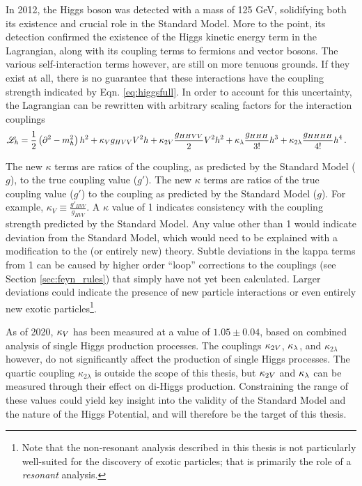     In 2012, the Higgs boson was detected with a mass of 125 GeV, solidifying both its existence and crucial role in the Standard Model.
    More to the point, its detection confirmed the existence of the Higgs kinetic energy term in the Lagrangian,
        along with its coupling terms to fermions and vector bosons.
    The various self-interaction terms however, are still on more tenuous grounds.
    If they exist at all, there is no guarantee that these interactions have the coupling strength indicated by Eqn. \ref{eq:higgsfull}.
    In order to account for this uncertainty, the Lagrangian can be rewritten with arbitrary scaling factors for the interaction couplings
    \begin{equation} \begin{split} \label{eq:higgskappas}
        \mathscr{L}_h &= \frac{1}{2} \left(\partial^2 - m_h^2 \right) h^2
            + \kappa_{V} g_{HVV} V^2 h + \kappa_{2V} \frac{g_{HHVV}}{2} V^2 h^2
            + \kappa_{\lambda} \frac{g_{HHH}}{3!} h^3 + \kappa_{2\lambda} \frac{g_{HHHH}}{4!} h^4
        \,.
    \end{split} \end{equation}

    The new $\kappa$ terms are ratios of the coupling, as predicted by the Standard Model ($g$), to the true coupling value ($g'$).
    The new $\kappa$ terms are ratios of the true coupling value ($g'$)
        to the coupling as predicted by the Standard Model ($g$).
    For example, $\kappa_V \equiv \frac{g'_{HVV}}{g_{HVV}}$.
    A $\kappa$ value of 1 indicates consistency with the coupling strength predicted by the Standard Model.
    Any value other than 1 would indicate deviation from the Standard Model,
        which would need to be explained with a modification to the (or entirely new) theory.
    Subtle deviations in the kappa terms from 1 can be caused by higher order ``loop'' corrections
        to the couplings (see Section \ref{sec:feyn_rules}) that simply have not yet been calculated.
    Larger deviations could indicate the presence of new particle interactions
        or even entirely new exotic particles\footnote{
            Note that the non-resonant analysis described in this thesis is not particularly well-suited for the discovery of exotic particles;
                that is primarily the role of a \textit{resonant} analysis.
        }.

    As of 2020, $\kappa_{V}$ has been measured at a value of $1.05 \pm 0.04$,
        based on combined analysis of single Higgs production processes\cite{paper:higgs_combined}.
    The couplings $\kappa_{2V}$, $\kappa_{\lambda}$, and $\kappa_{2\lambda}$ however, do not significantly affect the production of single Higgs processes.
    The quartic coupling $\kappa_{2\lambda}$ is outside the scope of this thesis,
        but $\kappa_{2V}$ and $\kappa_{\lambda}$ can be measured through their effect on di-Higgs production.
    Constraining the range of these values could yield key insight into the validity of the Standard Model and the nature of the Higgs Potential,
        and will therefore be the target of this thesis.
